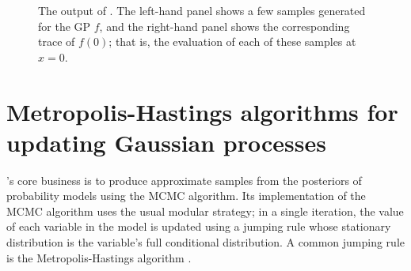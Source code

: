 \documentclass[article]{jss}
\begin{document}

\begin{figure}
    \centering
    \caption{The output of . The left-hand panel shows a few samples generated for the GP $f$, and the right-hand panel shows the corresponding trace of $f(0)$; that is, the evaluation of each of these samples at $x=0$.}
    \label{fig:MCMCOutput}
\end{figure}
 

\section{Metropolis-Hastings algorithms for updating Gaussian processes}
\label{sec:step-methods}

's core business is to produce approximate samples from the posteriors of probability models using the MCMC algorithm. Its implementation of the MCMC algorithm uses the usual modular strategy; in a single iteration, the value of each variable in the model is updated using a jumping rule whose stationary distribution is the variable's full conditional distribution. A common jumping rule is the Metropolis-Hastings algorithm \citep{gamerman}. 
\end{document}
